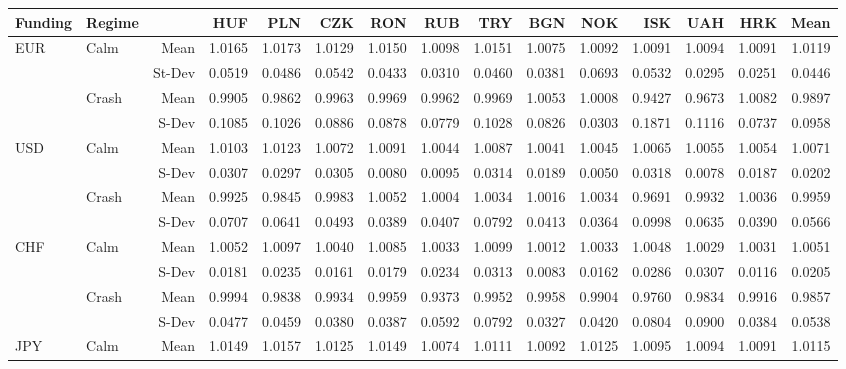 \documentclass[12pt, a4paper, oneside]{article} %
\begin{document}
\begin{landscape}
\begin{table}[ht]
\centering
\begin{tabular}{llrrrrrrrrrrrrr}
  \hline
 Funding & Regime& & HUF & PLN & CZK & RON & RUB & TRY & BGN & NOK & ISK & UAH & HRK & Mean \\ 
  \hline
  \hline
\multirow{4}{*}{EUR}& \multirow{2}{*}{Calm}& Mean & 1.0165 & 1.0173 & 1.0129 & 1.0150 & 1.0098 & 1.0151 & 1.0075 & 1.0092 & 1.0091 & 1.0094 & 1.0091 & 1.0119 \\ 
&&St-Dev& 0.0519 & 0.0486 & 0.0542 & 0.0433 & 0.0310 & 0.0460 & 0.0381 & 0.0693 & 0.0532 & 0.0295 & 0.0251 & 0.0446 \\ 
&\multirow{2}{*}{Crash}& Mean & 0.9905 & 0.9862 & 0.9963 & 0.9969 & 0.9962 & 0.9969 & 1.0053 & 1.0008 & 0.9427 & 0.9673 & 1.0082 & 0.9897 \\ 
 &&S-Dev & 0.1085 & 0.1026 & 0.0886 & 0.0878 & 0.0779 & 0.1028 & 0.0826 & 0.0303 & 0.1871 & 0.1116 & 0.0737 & 0.0958 \\ 
\hline
\multirow{4}{*}{USD}&\multirow{2}{*}{Calm}&Mean& 1.0103 & 1.0123 & 1.0072 & 1.0091 & 1.0044 & 1.0087 & 1.0041 & 1.0045 & 1.0065 & 1.0055 & 1.0054 & 1.0071 \\ 
&&S-Dev& 0.0307 & 0.0297 & 0.0305 & 0.0080 & 0.0095 & 0.0314 & 0.0189 & 0.0050 & 0.0318 & 0.0078 & 0.0187 & 0.0202 \\ 
  &\multirow{2}{*}{Crash}&Mean& 0.9925 & 0.9845 & 0.9983 & 1.0052 & 1.0004 & 1.0034 & 1.0016 & 1.0034 & 0.9691 & 0.9932 & 1.0036 & 0.9959 \\ 
   & & S-Dev & 0.0707 & 0.0641 & 0.0493 & 0.0389 & 0.0407 & 0.0792 & 0.0413 & 0.0364 & 0.0998 & 0.0635 & 0.0390 & 0.0566 \\ 
\hline
\multirow{4}{*}{CHF}& \multirow{2}{*}{Calm}&Mean& 1.0052 & 1.0097 & 1.0040 & 1.0085 & 1.0033 & 1.0099 & 1.0012 & 1.0033 & 1.0048 & 1.0029 & 1.0031 & 1.0051 \\ 
   & & S-Dev & 0.0181 & 0.0235 & 0.0161 & 0.0179 & 0.0234 & 0.0313 & 0.0083 & 0.0162 & 0.0286 & 0.0307 & 0.0116 & 0.0205 \\ 
   & \multirow{2}{*}{Crash}& Mean & 0.9994 & 0.9838 & 0.9934 & 0.9959 & 0.9373 & 0.9952 & 0.9958 & 0.9904 & 0.9760 & 0.9834 & 0.9916 & 0.9857 \\ 
  & & S-Dev & 0.0477 & 0.0459 & 0.0380 & 0.0387 & 0.0592 & 0.0792 & 0.0327 & 0.0420 & 0.0804 & 0.0900 & 0.0384 & 0.0538 \\ 
\hline  
  \multirow{4}{*}{JPY}&\multirow{2}{*}{Calm}& Mean& 1.0149 & 1.0157 & 1.0125 & 1.0149 & 1.0074 & 1.0111 & 1.0092 & 1.0125 & 1.0095 & 1.0094 & 1.0091 & 1.0115 \\ 

\end{tabular}
\end{table}
\end{landscape}
\end{document}
